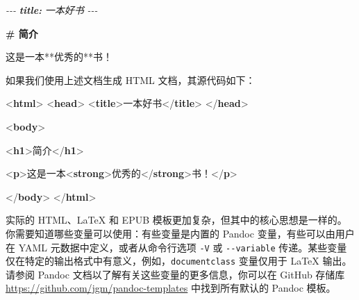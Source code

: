 \documentclass[
  12pt,
]{krantz}
\newenvironment{Shaded}{\begin{snugshade}}{\end{snugshade}}
\newcommand{\AnnotationTok}[1]{\textcolor[rgb]{0.56,0.35,0.01}{\textbf{\textit{#1}}}}
\newcommand{\CommentTok}[1]{\textcolor[rgb]{0.56,0.35,0.01}{\textit{#1}}}
\newcommand{\DataTypeTok}[1]{\textcolor[rgb]{0.13,0.29,0.53}{#1}}
\newcommand{\FunctionTok}[1]{\textcolor[rgb]{0.13,0.29,0.53}{\textbf{#1}}}
\newcommand{\KeywordTok}[1]{\textcolor[rgb]{0.13,0.29,0.53}{\textbf{#1}}}
\newcommand{\NormalTok}[1]{#1}
\theoremstyle{definition}
\theoremstyle{definition}
\theoremstyle{definition}
\theoremstyle{definition}
\theoremstyle{remark}
\begin{document}
\begin{Shaded}
\begin{Highlighting}[]
\CommentTok{{-}{-}{-}}
\AnnotationTok{title:}\CommentTok{ 一本好书}
\CommentTok{{-}{-}{-}}

\FunctionTok{\# 简介}

\NormalTok{这是一本**优秀的**书！}
\end{Highlighting}
\end{Shaded}

如果我们使用上述文档生成 HTML 文档，其源代码如下：

\begin{Shaded}
\begin{Highlighting}[]
\DataTypeTok{\textless{}}\KeywordTok{html}\DataTypeTok{\textgreater{}}
  \DataTypeTok{\textless{}}\KeywordTok{head}\DataTypeTok{\textgreater{}}
    \DataTypeTok{\textless{}}\KeywordTok{title}\DataTypeTok{\textgreater{}}\NormalTok{一本好书}\DataTypeTok{\textless{}/}\KeywordTok{title}\DataTypeTok{\textgreater{}}
  \DataTypeTok{\textless{}/}\KeywordTok{head}\DataTypeTok{\textgreater{}}
  
  \DataTypeTok{\textless{}}\KeywordTok{body}\DataTypeTok{\textgreater{}}
  
  \DataTypeTok{\textless{}}\KeywordTok{h1}\DataTypeTok{\textgreater{}}\NormalTok{简介}\DataTypeTok{\textless{}/}\KeywordTok{h1}\DataTypeTok{\textgreater{}}
  
  \DataTypeTok{\textless{}}\KeywordTok{p}\DataTypeTok{\textgreater{}}\NormalTok{这是一本}\DataTypeTok{\textless{}}\KeywordTok{strong}\DataTypeTok{\textgreater{}}\NormalTok{优秀的}\DataTypeTok{\textless{}/}\KeywordTok{strong}\DataTypeTok{\textgreater{}}\NormalTok{书！}\DataTypeTok{\textless{}/}\KeywordTok{p}\DataTypeTok{\textgreater{}}
  
  \DataTypeTok{\textless{}/}\KeywordTok{body}\DataTypeTok{\textgreater{}}
\DataTypeTok{\textless{}/}\KeywordTok{html}\DataTypeTok{\textgreater{}}
\end{Highlighting}
\end{Shaded}

实际的 HTML、LaTeX 和 EPUB 模板更加复杂，但其中的核心思想是一样的。你需要知道哪些变量可以使用：有些变量是内置的 Pandoc 变量，有些可以由用户在 YAML 元数据中定义，或者从命令行选项 \texttt{-V} 或 \texttt{-\/-variable} 传递。某些变量仅在特定的输出格式中有意义，例如，\texttt{documentclass} 变量仅用于 LaTeX 输出。请参阅 Pandoc 文档以了解有关这些变量的更多信息，你可以在 GitHub 存储库 \url{https://github.com/jgm/pandoc-templates} 中找到所有默认的 Pandoc 模板。
\end{document}
